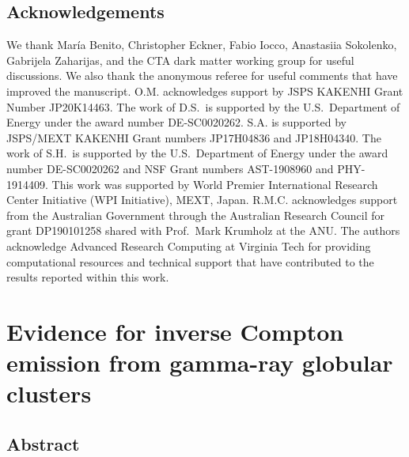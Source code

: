 \documentclass[doublespace,nopageskip]{VTthesis} %
\begin{document}


\section*{Acknowledgements}

We thank Mar\'ia Benito, Christopher Eckner, Fabio Iocco,  Anastasiia Sokolenko, Gabrijela Zaharijas, and the CTA dark matter working group for useful discussions. We also thank the anonymous referee for useful comments that have improved the manuscript. O.M. acknowledges support by JSPS KAKENHI Grant Number JP20K14463.  The work of D.S.\ is supported by the U.S.\ Department of Energy under the award number DE-SC0020262.
S.A. is supported by JSPS/MEXT KAKENHI Grant numbers JP17H04836 and JP18H04340.
The work of S.H.\ is supported by the U.S.\ Department of Energy under the award number DE-SC0020262 and NSF Grant numbers AST-1908960 and PHY-1914409. This work was supported by World Premier International Research Center Initiative (WPI Initiative), MEXT, Japan. R.M.C. acknowledges support from the Australian Government through the Australian Research Council for grant DP190101258 shared with Prof.~Mark Krumholz at the ANU. The authors acknowledge Advanced Research Computing at Virginia Tech for providing computational resources and technical support that have contributed to the results reported within this work.

\chapter{Evidence for inverse Compton emission from gamma-ray globular clusters} \label{ch:globular_cluster}

\section{Abstract}
\end{document}
